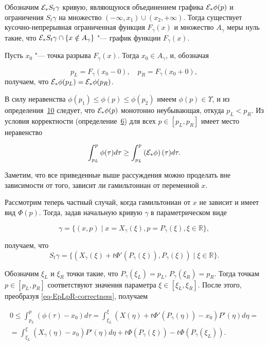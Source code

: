 Обозначим ${\cal E}_*S_t\gamma$ кривую, являющуюся объединением графика ${\cal E}_*\phi(p)$ и ограничения $S_t\gamma$ на множество $(-\infty,x_1)\cup(x_2,+\infty)$. Тогда существует кусочно-непрерывная ограниченная функция $F_{\gamma}(x)$ и множество $A_{\gamma}$ меры нуль такие, что ${\cal E}_*S_t\gamma\cap\{x\notin A_{\gamma}\}$ "--- график функции $F_{\gamma}(x)$. 



Пусть $x_0$ "--- точка разрыва $F_{\gamma}(x)$. Тогда $x_0\in A_{\gamma}$, и, обозначая 

$$p_L=F_{\gamma}({x_0-0}),\quad p_R=F_{\gamma}(x_0+0),$$ получаем, что ${\cal E}_*\phi(p_L)={\cal E}_*\phi(p_R)$. 



В силу неравенства $\phi(p_1)\le\phi(p)\le\phi(p_2)$ имеем $\phi(p)\in\Upsilon$, и из определения~\hyperlink{palin:definition10}{10} следует, что ${\cal E}_*\phi(p)$ монотонно неубывающая, откуда $p_L<p_R$. Из условия корректности (определение~\hyperlink{palin:definition6}{6}) для всех $p\in[p_L,p_R]$ имеет место неравенство

\begin{gather}

\int _{p_L}^p\phi(\tau)d\tau\ge\int _{p_L}^p\left({\cal E}_*\phi\right)(\tau)d\tau.\label{eq-EpLpR-correctness}

\end{gather}



Заметим, что все приведенные выше рассуждения можно проделать вне зависимости от того, зависит ли гамильтониан от переменной $x$. 

Рассмотрим теперь частный случай, когда гамильтониан от $x$ не зависит и имеет вид $\Phi(p)$. Тогда, задав начальную кривую $\gamma$ в параметрическом виде 

$$\gamma=\{(x,p)\mid x=X_{\gamma}(\xi), p=P_{\gamma}(\xi), \xi\in\mathbb{R}\},$$ 

получаем, что $$S_t\gamma=\{(X_{\gamma}(\xi)+t\Phi'(P_{\gamma}(\xi)), P_{\gamma}(\xi))\mid \xi\in\mathbb{R}\}.$$ 

Обозначим $\xi_L$ и $\xi_R$ точки такие, что $P_{\gamma}(\xi_L)=p_L$, $P_{\gamma}(\xi_R)=p_R$. Тогда точкам $p\in[p_L,p_R]$ соответствуют значения параметра $\xi\in[\xi_L,\xi_R]$. После этого, преобразуя \eqref{eq-EpLpR-correctness}, получаем

\begin{multline}

0\le\int _{p_L}^p(\phi(\tau)-x_0)d\tau=\int _{\xi_L}^{\xi}(X(\eta)+t\Phi'(P_{\gamma}(\eta))-x_0)P'(\eta)d\eta=

\\

=\int _{\xi_L}^{\xi}(X_{\gamma}(\eta)-x_0)P'(\eta)d\eta+t\Phi(P_{\gamma}(\xi))-t\Phi(P_{\gamma}(\xi_L)).

\end{multline}




